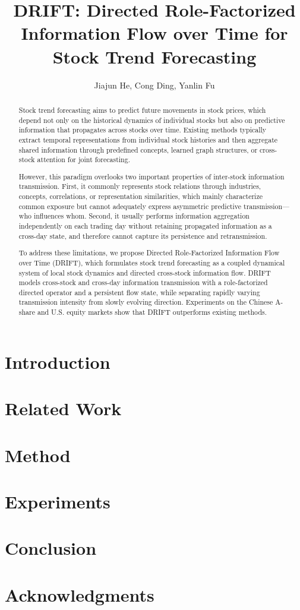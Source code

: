 \documentclass[letterpaper]{article}
\title{DRIFT: Directed Role-Factorized Information Flow over Time for Stock Trend Forecasting}
\author{
Jiajun He, Cong Ding, Yanlin Fu
}
\begin{document}
\maketitle

\begin{abstract}
Stock trend forecasting aims to predict future movements in stock prices, which depend not only on the historical dynamics of individual stocks but also on predictive information that propagates across stocks over time. Existing methods typically extract temporal representations from individual stock histories and then aggregate shared information through predefined concepts, learned graph structures, or cross-stock attention for joint forecasting.

However, this paradigm overlooks two important properties of inter-stock information transmission. First, it commonly represents stock relations through industries, concepts, correlations, or representation similarities, which mainly characterize common exposure but cannot adequately express asymmetric predictive transmission---who influences whom. Second, it usually performs information aggregation independently on each trading day without retaining propagated information as a cross-day state, and therefore cannot capture its persistence and retransmission.

To address these limitations, we propose Directed Role-Factorized Information Flow over Time (DRIFT), which formulates stock trend forecasting as a coupled dynamical system of local stock dynamics and directed cross-stock information flow. DRIFT models cross-stock and cross-day information transmission with a role-factorized directed operator and a persistent flow state, while separating rapidly varying transmission intensity from slowly evolving direction. Experiments on the Chinese A-share and U.S. equity markets show that DRIFT outperforms existing methods.
\end{abstract}

\section{Introduction}

\section{Related Work}

\section{Method}

\section{Experiments}

\section{Conclusion}

\section*{Acknowledgments}


\end{document}
